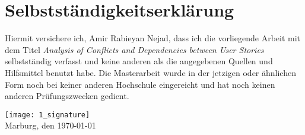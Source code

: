 \section*{Selbstständigkeitserklärung}
Hiermit versichere ich, Amir Rabieyan Nejad, dass ich die vorliegende Arbeit mit dem Titel \emph{Analysis of Conflicts and Dependencies between User Stories} selbstständig verfasst und keine anderen als die angegebenen Quellen und Hilfsmittel benutzt habe. Die Masterarbeit wurde in der jetzigen oder ähnlichen Form noch bei keiner anderen Hochschule eingereicht und hat noch keinen anderen Prüfungszwecken gedient.

\begin{flushleft}
\texttt{[image: 1\_signature]}\\
Marburg, den \today
{}
\end{flushleft}






